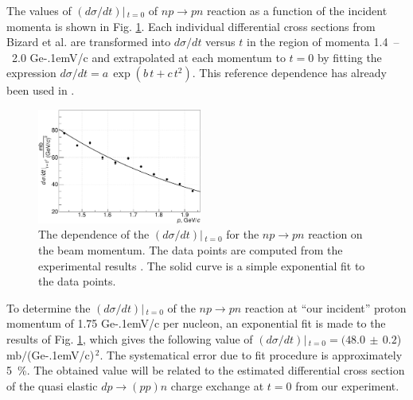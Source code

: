 \documentclass[twocolumn,epjc3]{svjour3}
\newcommand{\np}     {\ensuremath{np \rightarrow pn}\xspace}
\newcommand{\dpchex} {\ensuremath{dp \rightarrow (pp)n}\xspace}
\newcommand{\GeVc}   {Ge\kern-.1emV/c\xspace}
\begin{document}
The values of $(d\sigma/dt)|\,_{t=0}$ of \np reaction as a function of the
incident momenta is shown in Fig. \ref{fig:npsigma}. Each individual
differential cross sections from Bizard et al. \cite{biz75} are transformed into
$d\sigma/dt$ versus $t$ in the region of momenta 1.4~--~2.0 \GeVc and
extrapolated at each momentum to $t=0$ by fitting the expression
$d\sigma/dt = a\,\exp(b\,t + c\,t^2)$. This reference dependence has already
been used in \cite{gla08}.

\begin{figure}[h]
  \centering
  \includegraphics[width=0.48\textwidth]{np_dSigma.pdf}
  \caption{The dependence of the $(d\sigma/dt)|\,_{t=0}$ for the \np reaction on
    the beam momentum. The data points are computed from the experimental
    results \cite{biz75}. The solid curve is a simple exponential fit to the
    data points.}
  \label{fig:npsigma}
\end{figure}

To determine the $(d\sigma/dt)|\,_{t=0}$ of the \np reaction at ``our incident''
proton momentum of 1.75 \GeVc per nucleon, an exponential fit is made to the
results of Fig. \ref{fig:npsigma}, which gives the following value of
$(d\sigma/dt)|\,_{t=0} = (48.0\,\pm\,0.2$) mb$/$(\GeVc)$^{\,2}$. The
systematical error due to fit procedure is approximately 5~\%. The obtained
value will be related to the estimated differential cross section of the quasi
elastic \dpchex charge exchange at $t=0$ from our experiment.
\end{document}

